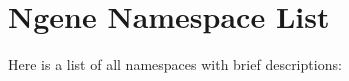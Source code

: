 \section{Ngene Namespace List}
Here is a list of all namespaces with brief descriptions:\begin{CompactList}
\item{}
\end{CompactList}
